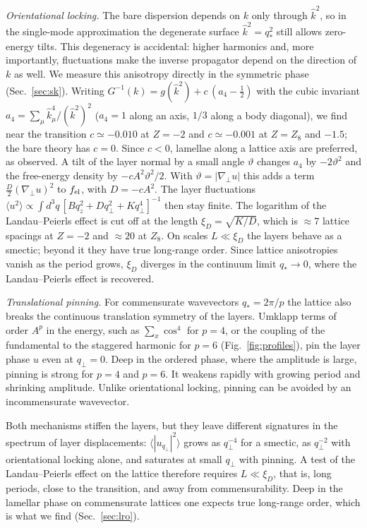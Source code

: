 \documentclass[aps,prd,twocolumn,superscriptaddress,nofootinbib,10pt]{revtex4-2}
\newcommand{\khat}{\widehat{k}^{2}}
\newcommand{\qs}{q_*}
\begin{document}
\emph{Orientational locking.}  The bare dispersion depends on $k$ only
through $\khat$, so in the single-mode approximation the degenerate surface
$\khat=\qs^2$ still allows zero-energy tilts.  This degeneracy is accidental:
higher harmonics and, more importantly, fluctuations make the inverse
propagator depend on the direction of $k$ as well.  We measure this
anisotropy directly in the symmetric phase (Sec.~\ref{sec:sk}).  Writing
$G^{-1}(k)=g(\khat)+c\,(a_4-\tfrac12)$ with the cubic invariant
$a_4=\sum_\mu\hat k_\mu^4/(\khat)^2$ ($a_4=1$ along an axis, $1/3$ along a
body diagonal), we find near the transition $c\simeq-0.010$ at $Z=-2$ and
$c\simeq-0.001$ at $Z=Z_8$ and $-1.5$; the bare theory has $c=0$.  Since
$c<0$, lamellae along a lattice axis are preferred, as observed.  A tilt of
the layer normal by a small angle $\vartheta$ changes $a_4$ by
$-2\vartheta^2$ and the free-energy density by $-cA^2\vartheta^2/2$.  With
$\vartheta=|\nabla_\perp u|$ this adds a term $\frac D2(\nabla_\perp u)^2$
to $f_{\rm el}$, with $D=-cA^2$.  The layer fluctuations
$\langle u^2\rangle\propto\int d^3q\,[Bq_z^2+Dq_\perp^2+Kq_\perp^4]^{-1}$
then stay finite.  The logarithm of the Landau--Peierls effect is cut off
at the length $\xi_D=\sqrt{K/D}$, which is $\approx7$ lattice spacings at
$Z=-2$ and $\approx20$ at $Z_8$.  On scales $L\ll\xi_D$ the layers behave
as a smectic; beyond it they have true long-range order.  Since lattice
anisotropies vanish as the period grows, $\xi_D$ diverges in the continuum
limit $\qs\to0$, where the Landau--Peierls effect is recovered.

\emph{Translational pinning.}  For commensurate wavevectors $\qs=2\pi/p$ the
lattice also breaks the continuous translation symmetry of the layers.
Umklapp terms of order $A^p$ in the energy, such as $\sum_x\cos^4$ for
$p=4$, or the coupling of the fundamental to the staggered harmonic for
$p=6$ (Fig.~\ref{fig:profiles}), pin the layer phase $u$ even at
$q_\perp=0$.  Deep in the ordered phase, where the amplitude is large,
pinning is strong for $p=4$ and $p=6$.  It weakens rapidly with growing
period and shrinking amplitude.  Unlike orientational locking, pinning can
be avoided by an incommensurate wavevector.

Both mechanisms stiffen the layers, but they leave different signatures in
the spectrum of layer displacements: $\langle|u_{q_\perp}|^2\rangle$ grows
as $q_\perp^{-4}$ for a smectic, as $q_\perp^{-2}$ with orientational locking
alone, and saturates at small $q_\perp$ with pinning.  A test of the
Landau--Peierls effect on the lattice therefore requires $L\ll\xi_D$, that
is, long periods, close to the transition, and away from commensurability.
Deep in the lamellar phase on commensurate lattices one expects true
long-range order, which is what we find (Sec.~\ref{sec:lro}).
\end{document}
